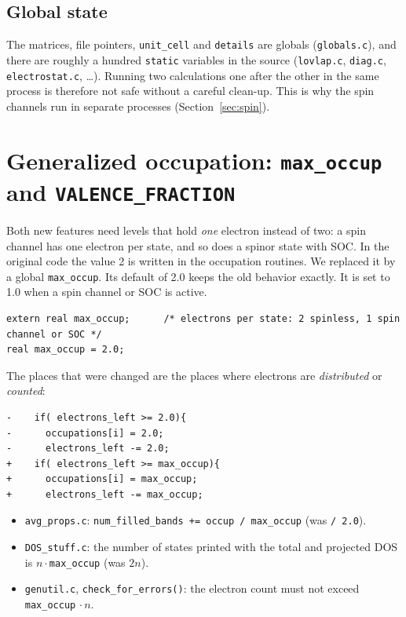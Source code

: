 \documentclass[11pt,a4paper]{article}
\newcommand{\file}[1]{\texttt{#1}}
\newcommand{\fn}[1]{\texttt{#1()}}
\newcommand{\var}[1]{\texttt{#1}}
\begin{document}
\subsection{Global state}

The matrices, file pointers, \var{unit\_cell} and \var{details} are globals
(\file{globals.c}), and there are roughly a hundred \texttt{static} variables in the
source (\file{lovlap.c}, \file{diag.c}, \file{electrostat.c}, \ldots). Running two
calculations one after the other in the same process is therefore not safe without a
careful clean-up. This is why the spin channels run in separate processes
(Section~\ref{sec:spin}).

\section{Generalized occupation: \texttt{max\_occup} and \texttt{VALENCE\_FRACTION}}\label{sec:occ}

Both new features need levels that hold \emph{one} electron instead of two: a spin
channel has one electron per state, and so does a spinor state with SOC. In the original
code the value 2 is written in the occupation routines. We replaced it by a global
\var{max\_occup}. Its default of 2.0 keeps the old behavior exactly. It is set to 1.0
when a spin channel or SOC is active.

\begin{lstlisting}[caption={\file{bind.h} / \file{globals.c}}]
extern real max_occup;      /* electrons per state: 2 spinless, 1 spin channel or SOC */
real max_occup = 2.0;
\end{lstlisting}

The places that were changed are the places where electrons are \emph{distributed} or
\emph{counted}:

\begin{lstlisting}[style=diff,caption={\fn{calc\_occupations} in \file{mulliken.c} (the same change in \fn{find\_crystal\_occupations}, \file{avg\_props.c})}]
-    if( electrons_left >= 2.0){
-      occupations[i] = 2.0;
-      electrons_left -= 2.0;
+    if( electrons_left >= max_occup){
+      occupations[i] = max_occup;
+      electrons_left -= max_occup;
\end{lstlisting}

\begin{itemize}
\item \file{avg\_props.c}: \var{num\_filled\_bands += occup / max\_occup} (was
  \texttt{/ 2.0}).
\item \file{DOS\_stuff.c}: the number of states printed with the total and projected DOS
  is $n\cdot$\var{max\_occup} (was $2n$).
\item \file{genutil.c}, \fn{check\_for\_errors}: the electron count must not exceed
  \var{max\_occup}$\,\cdot n$.
\end{itemize}
\end{document}
